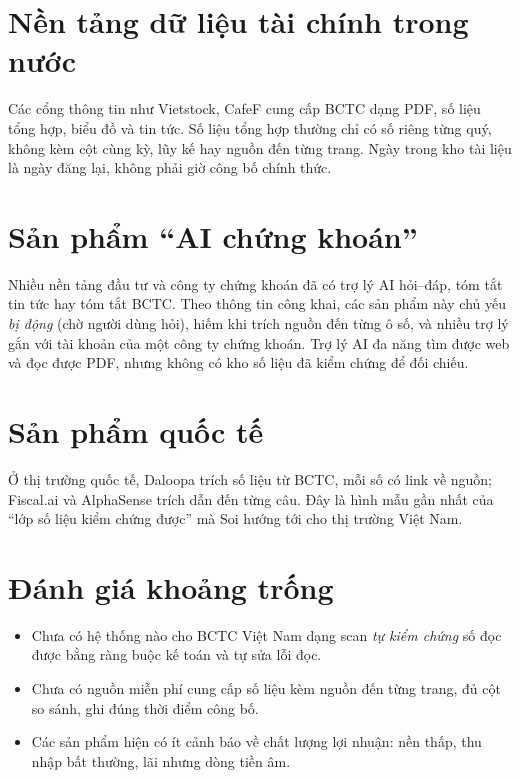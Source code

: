 \documentclass[12pt,a4paper]{report}
\newcommand{\enquote}[1]{“#1”}
\begin{document}
\section{Nền tảng dữ liệu tài chính trong nước}
Các cổng thông tin như Vietstock, CafeF cung cấp BCTC dạng PDF, số liệu tổng hợp, biểu đồ và tin tức. Số liệu tổng hợp
thường chỉ có số riêng từng quý, không kèm cột cùng kỳ, lũy kế hay nguồn đến từng trang. Ngày trong kho tài liệu là
ngày đăng lại, không phải giờ công bố chính thức.

\section{Sản phẩm \enquote{AI chứng khoán}}
Nhiều nền tảng đầu tư và công ty chứng khoán đã có trợ lý AI hỏi--đáp, tóm tắt tin tức hay tóm tắt BCTC. Theo thông tin
công khai, các sản phẩm này chủ yếu \emph{bị động} (chờ người dùng hỏi), hiếm khi trích nguồn đến từng ô số, và nhiều
trợ lý gắn với tài khoản của một công ty chứng khoán. Trợ lý AI đa năng tìm được web và đọc được PDF, nhưng không có kho
số liệu đã kiểm chứng để đối chiếu.

\section{Sản phẩm quốc tế}
Ở thị trường quốc tế, Daloopa trích số liệu từ BCTC, mỗi số có link về nguồn; Fiscal.ai và AlphaSense trích dẫn đến
từng câu. Đây là hình mẫu gần nhất của \enquote{lớp số liệu kiểm chứng được} mà Soi hướng tới cho thị trường Việt Nam.

\section{Đánh giá khoảng trống}
\begin{itemize}
  \item Chưa có hệ thống nào cho BCTC Việt Nam dạng scan \emph{tự kiểm chứng} số đọc được bằng ràng buộc kế toán và tự
        sửa lỗi đọc.
  \item Chưa có nguồn miễn phí cung cấp số liệu kèm nguồn đến từng trang, đủ cột so sánh, ghi đúng thời điểm công bố.
  \item Các sản phẩm hiện có ít cảnh báo về chất lượng lợi nhuận: nền thấp, thu nhập bất thường, lãi nhưng dòng tiền âm.
\end{itemize}

\end{document}
